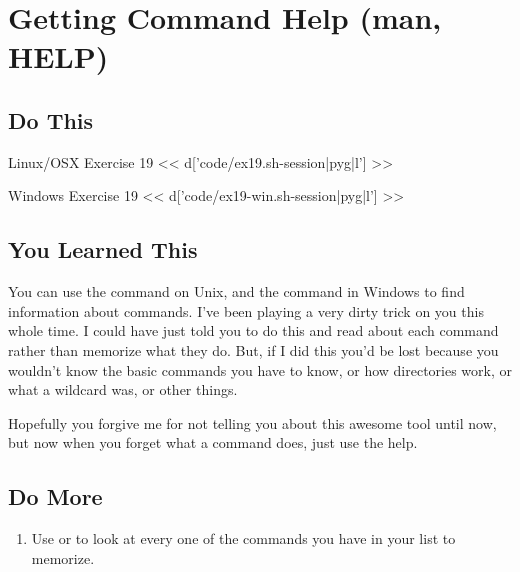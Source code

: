 \chapter{Getting Command Help (man, HELP)}

\section{Do This}

\begin{code}{Linux/OSX Exercise 19}
<< d['code/ex19.sh-session|pyg|l'] >>
\end{code}

\begin{code}{Windows Exercise 19}
<< d['code/ex19-win.sh-session|pyg|l'] >>
\end{code}

\section{You Learned This}

You can use the  command on Unix, and the  command
in Windows to find information about commands.  I've been playing a very dirty
trick on you this whole time.  I could have just told you to do this and read
about each command rather than memorize what they do.  But, if I did this you'd
be lost because you wouldn't know the basic commands you have to know, or how
directories work, or what a wildcard was, or other things.

Hopefully you forgive me for not telling you about this awesome tool until now,
but now when you forget what a command does, just use the help.

\section{Do More}

\begin{enumerate}
\item Use  or  to look at every one of the commands you have in your list to memorize.
\end{enumerate}

